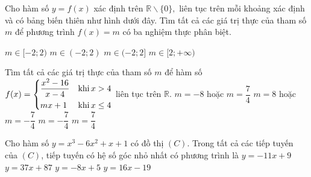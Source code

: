 \begin{ex}%
	Cho hàm số $y=f(x)$ xác định trên $\mathbb{R}\backslash\{0\},$ liên tục trên mỗi khoảng xác định và có bảng biến thiên như hình dưới đây. Tìm tất cả các giá trị thực của tham số $m$ để phương trình $f(x)=m$ có ba nghiệm thực phân biệt.
\begin{center}
\end{center}
\choice
{$m\in [-2;2)$}
{\True $m\in (-2;2)$}
{$m\in (-2;2]$}
{$m\in [2;+\infty)$}
\end{ex}

\begin{ex}%
Tìm tất cả các giá trị thực của tham số $m$ để hàm số $f(x)=\left\{\begin{aligned}& \dfrac{x^2-16}{x-4} & \text{khi}\, x>4\\ & mx+1 & \text{khi}\, x\le 4\end{aligned}\right.$ liên tục trên $\mathbb{R}$.
\choice
{$m=-8$ hoặc $m=\dfrac{7}{4}$}
{$m=8$ hoặc $m=-\dfrac{7}{4}$ }
{$m=-\dfrac{7}{4}$}
{\True $m=\dfrac{7}{4}$}
\end{ex}

\begin{ex}%
Cho hàm số $y=x^3-6x^2+x+1$ có đồ thị $(C)$.   Trong tất cả các tiếp tuyến của  $(C)$, tiếp tuyến có hệ số góc nhỏ nhất có phương trình là
\choice
{\True $y=-11x+9$}
{$y=37x+87$}
{$y=-8x+5$}
{$y=16x-19$}
\end{ex}

